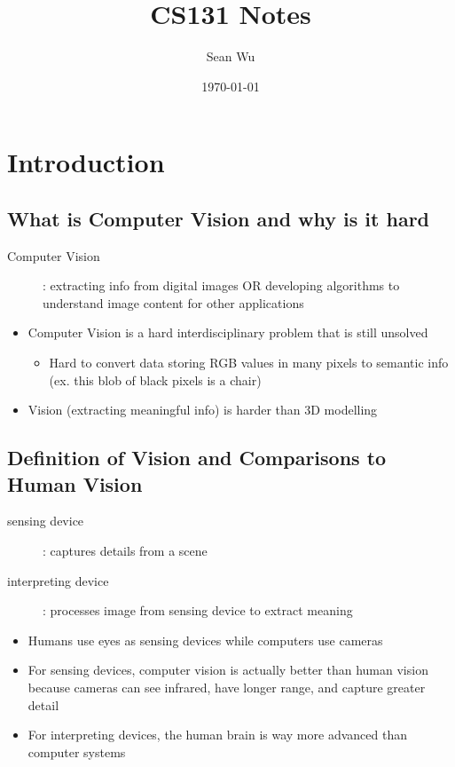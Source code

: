 \documentclass[letterpaper,12pt]{article}
\begin{document}
\title{CS131 Notes}
\author{Sean Wu}
\date{\today}
\maketitle

\tableofcontents

\pagebreak

\setlength{\parindent}{0em}
\setlength{\parskip}{1em}

\section{Introduction}
\subsection{What is Computer Vision and why is it hard}

\begin{description}
 \item[Computer Vision]: extracting info from digital images OR developing algorithms to understand image content for other applications
\end{description}
\begin{itemize}
 \item Computer Vision is a hard interdisciplinary problem that is still unsolved
       \begin{itemize}
        \item Hard to convert data storing RGB values in many pixels to semantic info (ex. this blob of black pixels is a chair)
       \end{itemize}
 \item Vision (extracting meaningful info) is harder than 3D modelling
\end{itemize}

\subsection{Definition of Vision and Comparisons to Human Vision}
\begin{description}
 \item[sensing device]: captures details from a scene
 \item[interpreting device]: processes image from sensing device to extract meaning
\end{description}

\begin{itemize}
 \item Humans use eyes as sensing devices while computers use cameras
 \item For sensing devices, computer vision is actually better than human vision because cameras can see infrared, have longer range, and capture greater detail
 \item For interpreting devices, the human brain is way more advanced than computer systems
\end{itemize}
\end{document}
